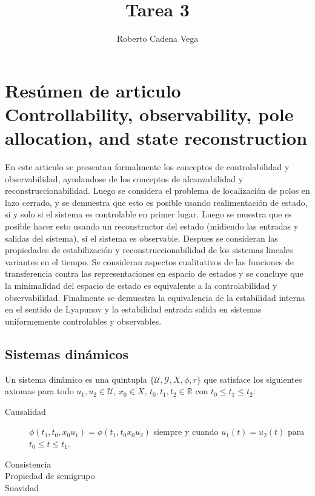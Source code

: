 

\author{Roberto Cadena Vega}
\title{Tarea 3}


    \maketitle

    \section{Resúmen de articulo Controllability, observability, pole allocation, and state reconstruction\cite{Willems1971}}

        En este articulo se presentan formalmente los conceptos de controlabilidad y observabilidad, ayudandose de los conceptos de alcanzabilidad y reconstruccionabilidad. Luego se considera el problema de localización de polos en lazo cerrado, y se demuestra que esto es posible usando realimentación de estado, si y solo si el sistema es controlable en primer lugar. Luego se muestra que es posible hacer esto usando un reconstructor del estado (midiendo las entradas y salidas del sistema), si el sistema es observable. Despues se consideran las propiedades de estabilización y reconstruccionabilidad de los sistemas lineales variantes en el tiempo. Se consideran aspectos cualitativos de las funciones de transferencia contra las representaciones en espacio de estados y se concluye que la minimalidad del espacio de estado es equivalente a la controlabilidad y observabilidad. Finalmente se demuestra la equivalencia de la estabilidad interna en el sentido de Lyapunov y la estabilidad entrada salida en sistemas uniformemente controlables y observables.

        \subsection{Sistemas dinámicos}

        	\begin{definicion}
        		Un sistema dinámico es una quintupla $\{ \mathcal{U}, \mathcal{Y}, X, \phi, r \}$ que satisface los siguientes axiomas para todo $u_1, u_2 \in \mathcal{U}$, $x_0 \in X$, $t_0, t_1, t_2 \in \mathbb{R}$ con $t_0 \leq t_1 \leq t_2$:

        		\begin{description}
        			\item[Causalidad] $\phi(t_1, t_0, x_0 u_1) = \phi(t_1, t_0 x_0 u_2)$ siempre y cuando $u_1(t) = u_2(t)$ para $t_0 \leq t \leq t_1$.
        			\item[Consistencia]
        			\item[Propiedad de semigrupo]
        			\item[Suavidad]
        		\end{description}
        	\end{definicion}

    
    

